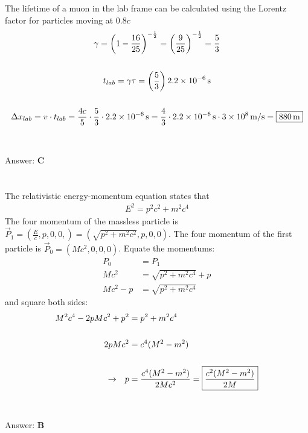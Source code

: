\documentclass[12pt]{article}
\newcommand{\Answer}[1]{Answer: \textbf{#1}}
\newcommand{\Problem}[3]{
    \setcounter{section}{#1}
    \addtocounter{section}{-1}
    \section{}
    #3\\\\
    \Answer{#2}
}
\begin{document}
\Problem{39}{C}{%
The lifetime of a muon in the lab frame can be calculated using the Lorentz factor for particles moving at $0.8c$
\begin{gather}
\gamma = {\left(1- \frac{16}{25} \right)}^{-\frac{1}{2}} = {\left(\frac{9}{25}\right)}^{-\frac{1}{2}} = \frac{5}{3}\nonumber\\
\nonumber\\
t_{lab} = \gamma \tau = \left(\frac{5}{3}\right) 2.2\times 10^{-6}\,\text{s} \nonumber\\
\nonumber\\
\Delta x_{lab} = v \cdot t_{lab} = \frac{4 c}{5}\cdot \frac{5}{3}\cdot 2.2\times 10^{-6}\,\text{s} = \frac{4}{3}\cdot 2.2\times 10^{-6}\,\text{s} \cdot 3\times 10^{8}\,\text{m/s} = \boxed{880\,\text{m}} \nonumber
\end{gather}
}

\Problem{40}{B}{%
The relativistic energy-momentum equation states that
\begin{align}
E^{2} = p^{2}c^{2} + m^{2}c^{4}
\end{align}
The four momentum of the massless particle is $\vec{P}_{1} = (\frac{E}{c},p,0,0,) = (\sqrt{p^2+m^2c^2},p,0,0)$. The four momentum of the first particle is $\vec{P}_{0}=(Mc^{2},0,0,0)$. Equate the momentums:
\begin{align}
P_{0} &= P_{1}\nonumber\\
M^{}c^{2} &=  \sqrt{p^2+m^2c^4} + p^{}\nonumber\\
M^{}c^{2} -p^{} &=  \sqrt{p^2+m^2c^4}\nonumber
\end{align}
and square both sides:
\begin{align}
M^{2}c^{4} - 2p M c^{2} + p^{2} &=  p^2+m^2c^4\nonumber\\
\nonumber\\
2pMc^{2} &= c^{4}(M^{2}-m^{2}) \nonumber\\
\nonumber\\
\rightarrow \hspace{.1in} p &=  \frac{c^{4}(M^{2}-m^{2})}{2Mc^{2}} = \boxed{\frac{c^{2}(M^{2}-m^{2})}{2M}}\nonumber
\end{align}
}
\end{document}
